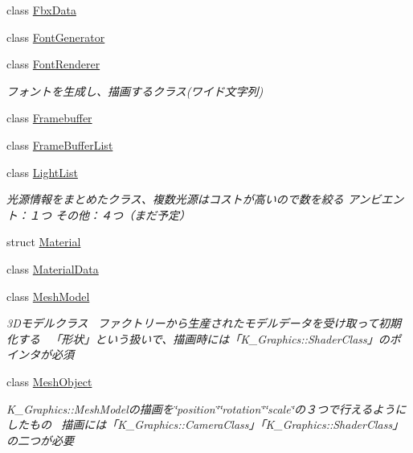 \begin{DoxyCompactItemize}
class \mbox{\hyperlink{class_k___graphics_1_1_fbx_data}{Fbx\+Data}}
\item 
class \mbox{\hyperlink{class_k___graphics_1_1_font_generator}{Font\+Generator}}
\item 
class \mbox{\hyperlink{class_k___graphics_1_1_font_renderer}{Font\+Renderer}}
\begin{DoxyCompactList}\small\item\em フォントを生成し、描画するクラス(ワイド文字列) \end{DoxyCompactList}\item 
class \mbox{\hyperlink{class_k___graphics_1_1_framebuffer}{Framebuffer}}
\item 
class \mbox{\hyperlink{class_k___graphics_1_1_frame_buffer_list}{Frame\+Buffer\+List}}
\item 
class \mbox{\hyperlink{class_k___graphics_1_1_light_list}{Light\+List}}
\begin{DoxyCompactList}\small\item\em 光源情報をまとめたクラス、複数光源はコストが高いので数を絞る アンビエント：１つ その他：４つ（まだ予定） \end{DoxyCompactList}\item 
struct \mbox{\hyperlink{struct_k___graphics_1_1_material}{Material}}
\item 
class \mbox{\hyperlink{class_k___graphics_1_1_material_data}{Material\+Data}}
\item 
class \mbox{\hyperlink{class_k___graphics_1_1_mesh_model}{Mesh\+Model}}
\begin{DoxyCompactList}\small\item\em 3\+Dモデルクラス~\newline
ファクトリーから生産されたモデルデータを受け取って初期化する~\newline
「形状」という扱いで、描画時には「\+K\+\_\+\+Graphics\+::\+Shader\+Class」のポインタが必須 \end{DoxyCompactList}\item 
class \mbox{\hyperlink{class_k___graphics_1_1_mesh_object}{Mesh\+Object}}
\begin{DoxyCompactList}\small\item\em K\+\_\+\+Graphics\+::\+Mesh\+Modelの描画を\char`\"{}position\char`\"{}\char`\"{}rotation\char`\"{}\char`\"{}scale\char`\"{}の３つで行えるようにしたもの~\newline
描画には「\+K\+\_\+\+Graphics\+::\+Camera\+Class」「\+K\+\_\+\+Graphics\+::\+Shader\+Class」の二つが必要 \end{DoxyCompactList}\item 

\end{DoxyCompactItemize}

